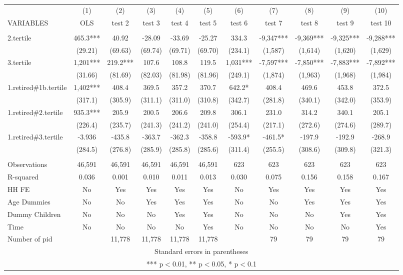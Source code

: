 \begin{tabular}{lcccccccccc} \hline
 & (1) & (2) & (3) & (4) & (5) & (6) & (7) & (8) & (9) & (10) \\
VARIABLES & OLS & test 2 & test 3 & test 4 & test 5 & test 6 & test 7 & test 8 & test 9 & test 10 \\ \hline
 &  &  &  &  &  &  &  &  &  &  \\
2.tertile & 465.3*** & 40.92 & -28.09 & -33.69 & -25.27 & 334.3 & -9,347*** & -9,369*** & -9,325*** & -9,288*** \\
 & (29.21) & (69.63) & (69.74) & (69.71) & (69.70) & (234.1) & (1,587) & (1,614) & (1,620) & (1,629) \\
3.tertile & 1,201*** & 219.2*** & 107.6 & 108.8 & 119.5 & 1,031*** & -7,597*** & -7,850*** & -7,883*** & -7,892*** \\
 & (31.66) & (81.69) & (82.03) & (81.98) & (81.96) & (249.1) & (1,874) & (1,963) & (1,968) & (1,984) \\
1.retired\#1b.tertile & 1,402*** & 408.4 & 369.5 & 357.2 & 370.7 & 642.2* & 408.4 & 469.6 & 453.8 & 372.5 \\
 & (317.1) & (305.9) & (311.1) & (311.0) & (310.8) & (342.7) & (281.8) & (340.1) & (342.0) & (353.9) \\
1.retired\#2.tertile & 935.3*** & 205.9 & 200.5 & 206.6 & 209.8 & 306.1 & 231.0 & 314.2 & 340.1 & 205.1 \\
 & (226.4) & (235.7) & (241.3) & (241.2) & (241.0) & (254.4) & (217.1) & (272.6) & (274.6) & (289.7) \\
1.retired\#3.tertile & -3.936 & -435.8 & -363.7 & -362.3 & -358.8 & -593.9* & -461.5* & -197.9 & -192.9 & -268.9 \\
 & (284.5) & (276.8) & (285.9) & (285.8) & (285.6) & (311.4) & (255.5) & (308.6) & (309.8) & (321.3) \\
 &  &  &  &  &  &  &  &  &  &  \\
Observations & 46,591 & 46,591 & 46,591 & 46,591 & 46,591 & 623 & 623 & 623 & 623 & 623 \\
R-squared & 0.036 & 0.001 & 0.010 & 0.011 & 0.013 & 0.030 & 0.075 & 0.156 & 0.158 & 0.167 \\
HH FE & No & Yes & Yes & Yes & Yes & No & Yes & Yes & Yes & Yes \\
Age Dummies & No & No & Yes & Yes & Yes & No & No & Yes & Yes & Yes \\
Dummy Children & No & No & No & Yes & Yes & No & No & No & Yes & Yes \\
Time & No & No & No & No & Yes & No & No & No & No & Yes \\
 Number of pid &  & 11,778 & 11,778 & 11,778 & 11,778 &  & 79 & 79 & 79 & 79 \\ \hline
\multicolumn{11}{c}{ Standard errors in parentheses} \\
\multicolumn{11}{c}{ *** p$<$0.01, ** p$<$0.05, * p$<$0.1} \\
\end{tabular}
